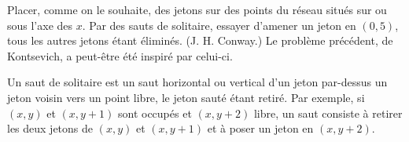 Placer, comme on le souhaite, des jetons sur des points du réseau situés sur ou sous l'axe des $x$. Par des sauts de solitaire, essayer d'amener un jeton en $(0, 5)$, tous les autres jetons étant éliminés. (J. H. Conway.) Le problème précédent, de Kontsevich, a peut-être été inspiré par celui-ci.

Un saut de solitaire est un saut horizontal ou vertical d'un jeton par-dessus un jeton voisin vers un point libre, le jeton sauté étant retiré. Par exemple, si $(x, y)$ et $(x, y + 1)$ sont occupés et $(x, y + 2)$ libre, un saut consiste à retirer les deux jetons de $(x, y)$ et $(x, y + 1)$ et à poser un jeton en $(x, y + 2)$.
